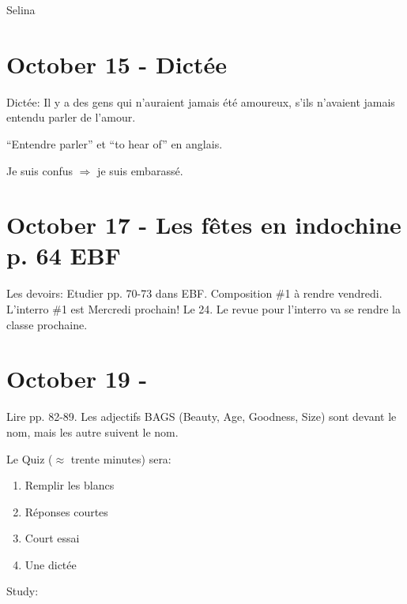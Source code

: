 \documentclass{report}
\begin{document}
Selina

\section{October 15 - Dict\'ee}

Dict\'ee: Il y a des gens qui n'auraient jamais \'et\'e amoureux, s'ils n'avaient jamais entendu parler de l'amour. 

``Entendre parler'' et ``to hear of'' en anglais. 

Je suis confus $\Rightarrow$ je suis embarass\'e.

\section{October 17 - Les f\^etes en indochine p. 64 EBF}

Les devoirs: Etudier pp. 70-73 dans EBF. Composition \#1 \`a rendre vendredi. L'interro \#1 est Mercredi prochain! Le 24. Le revue pour l'interro va se rendre la classe prochaine.

\section{October 19 - }

Lire pp. 82-89. Les adjectifs BAGS (Beauty, Age, Goodness, Size) sont devant le nom, mais les autre suivent le nom.

Le Quiz ($\approx$ trente minutes) 	sera:

\begin{enumerate}
\item Remplir les blancs
\item R\'eponses courtes
\item Court essai
\item Une dict\'ee
\end{enumerate}

Study:
\end{document}

